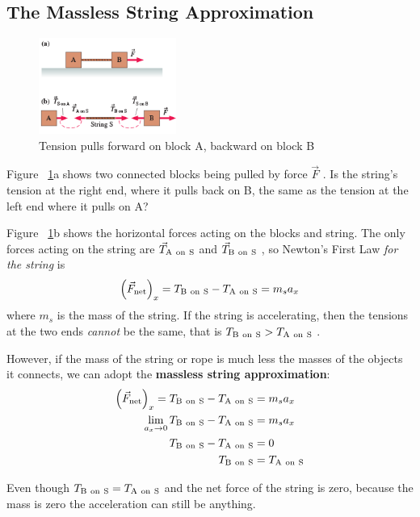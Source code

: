\subsection{The Massless String Approximation}

\begin{figure}
    \centering
    \includegraphics[width=0.4\textwidth]{../figures/two-blocks-accelerating-tension.png}
    \caption{Tension pulls forward on block A, backward on block B}%
    \label{fig:accelerating-tension}
\end{figure}

Figure~%
\ref{fig:accelerating-tension}a shows two connected blocks being pulled
by force
$
    \vec{F}
$%
.  Is the string's tension at the right end, where it pulls back on B,
the same as the tension at the left end where it pulls on A?

Figure~%
\ref{fig:accelerating-tension}b shows the horizontal forces acting on
the blocks and string.  The only forces acting on the string are
$
    \vec{T}_{\mathrm{A~on~S}}
$ and
$
    \vec{T}_{\mathrm{B~on~S}}
$%
, so Newton's First Law \emph{for the string} is
\begin{equation}
    \left(\vec{F}_{\mathrm{net}}\right)_x=T_{\mathrm{B~on~S}}-T_{\mathrm{A~on~S}}=m_sa_x
\end{equation}
where
$
    m_s
$ is the mass of the string.  If the string is accelerating, then the
tensions at the two ends \emph{cannot} be the same, that is
$
    T_{\mathrm{B~on~S}} > T_{\mathrm{A~on~S}}
$%
.

However, if the mass of the string or rope is much less the masses of
the objects it connects, we can adopt the \textbf{massless string
approximation}:
\begin{align}
    \left(\vec{F}_{\mathrm{net}}\right)_x = T_{\mathrm{B~on~S}}-T_{\mathrm{A~on~S}} &= m_sa_x \\
    \lim_{a_x \to 0}T_{\mathrm{B~on~S}}-T_{\mathrm{A~on~S}} &= m_sa_x \\
    T_{\mathrm{B~on~S}}-T_{\mathrm{A~on~S}} &= 0 \\
    T_{\mathrm{B~on~S}} &= T_{\mathrm{A~on~S}}
\end{align}
\begin{remark}
    Even though
    $
        T_{\mathrm{B~on~S}} = T_{\mathrm{A~on~S}}
    $ and the net force of the string is zero, because the mass is zero
    the acceleration can still be anything.
\end{remark}

